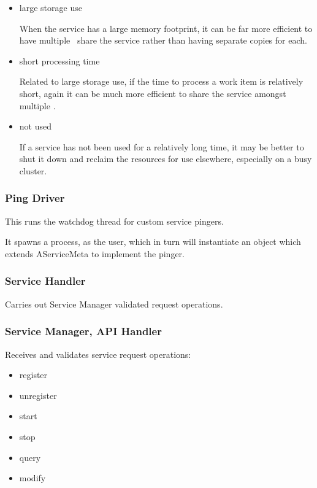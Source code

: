 \begin{itemize}
\begin{itemize}
      \item large storage use
      
      When the service has a large memory footprint, it can be far more
      efficient to have multiple \varJobs~share the service rather than
      having separate copies for each.
      
      \item short processing time
      
      Related to large storage use, if the time to process a work item is
      relatively short, again it can be much more efficient to share the
      service amongst multiple \varJobs.
      
      \item not used
      
      If a service has not been used for a relatively long time, it may be 
      better to shut it down and reclaim the resources for use elsewhere, 
      especially on a busy cluster.
            
    \end{itemize}
    
    \subsubsection{Ping Driver} 
    
    This runs the watchdog thread for custom service pingers.
 
    It spawns a process, as the user, which in turn will instantiate an object which extends
    AServiceMeta to implement the pinger.
    
    \subsubsection{Service Handler} 
    
    Carries out Service Manager validated request operations.
            
    \subsubsection{Service Manager, API Handler} 
    
    Receives and validates service request operations:
    
    \begin{itemize}
      \item register
      \item unregister
      \item start
      \item stop
      \item query
      \item modify
    \end{itemize}
    

\end{itemize}
